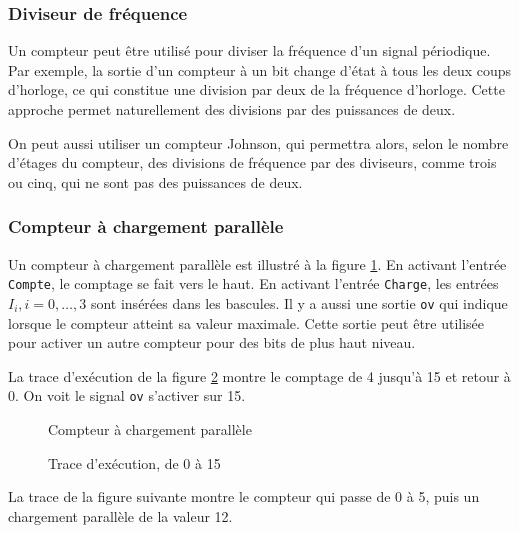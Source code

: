 \documentclass[11pt]{article}
\begin{document}
\subsubsection{Diviseur de fréquence}
\label{sec:org636009b}

Un compteur peut être utilisé pour diviser la fréquence d'un signal
périodique. Par exemple, la sortie d'un compteur à un bit change
d'état à tous les deux coups d'horloge, ce qui constitue une division
par deux de la fréquence d'horloge. Cette approche permet
naturellement des divisions par des puissances de deux.

On peut aussi utiliser un compteur Johnson, qui permettra alors, selon
le nombre d'étages du compteur, des divisions de fréquence par des
diviseurs, comme trois ou cinq, qui ne sont pas des puissances de deux.

\subsubsection{Compteur à chargement parallèle}
\label{sec:org19b0449}

Un compteur à chargement parallèle est illustré à la figure
\ref{fig:org137a9da}. En activant l'entrée \texttt{Compte}, le comptage
se fait vers le haut. En activant l'entrée \texttt{Charge}, les entrées \(I_i, i=0, \ldots, 3\) sont insérées dans les bascules. Il y a aussi une
sortie \texttt{ov} qui indique lorsque le compteur atteint sa valeur
maximale. Cette sortie peut être utilisée pour activer un autre
compteur pour des bits de plus haut niveau.

La trace d’exécution de la figure \ref{fig:orgeb12f73}
montre le comptage de 4 jusqu'à 15 et retour à 0. On voit le signal
\texttt{ov} s'activer sur 15. 

\begin{figure}[htbp]
\centering

\caption{\label{fig:org137a9da}Compteur à chargement parallèle}
\end{figure}

\begin{figure}[htbp]
\centering

\caption{\label{fig:orgeb12f73}Trace d'exécution, de 0 à 15}
\end{figure}

La trace de la figure suivante montre le compteur qui
passe de 0 à 5, puis un chargement parallèle de la valeur 12.
\end{document}
